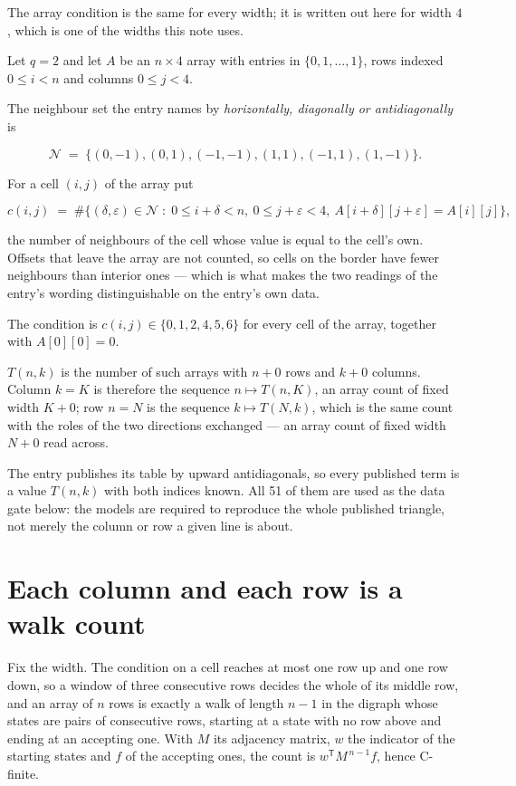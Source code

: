 \documentclass[11pt]{article}
\theoremstyle{definition}
\begin{document}
The array condition is the same for every width; it is written out here for width $4$, which is one of the widths this note uses.

Let $q = 2$ and let $A$ be an $n \times 4$ array with entries in $\{0,1,\dots,1\}$, rows indexed $0 \le i < n$ and columns $0 \le j < 4$.

The neighbour set the entry names by {\itshape horizontally, diagonally or antidiagonally} is

\[\mathcal{N} \;=\; \{(0,-1), (0,1), (-1,-1), (1,1), (-1,1), (1,-1)\}.\]

For a cell $(i,j)$ of the array put

\[c(i,j) \;=\; \#\bigl\{(\delta,\varepsilon)\in\mathcal{N} \;:\; 0\le i+\delta<n,\ 0\le j+\varepsilon<4,\ A[i+\delta][j+\varepsilon] = A[i][j]\bigr\},\]

the number of neighbours of the cell whose value is equal to the cell's own. Offsets that leave the array are not counted, so cells on the border have fewer neighbours than interior ones --- which is what makes the two readings of the entry's wording distinguishable on the entry's own data.

The condition is $c(i,j) \in \{0, 1, 2, 4, 5, 6\}$ for every cell of the array, together with $A[0][0]=0$.

$T(n,k)$ is the number of such arrays with $n + 0$ rows and $k + 0$ columns. Column $k = K$ is therefore the sequence $n \mapsto T(n,K)$, an array count of fixed width $K + 0$; row $n = N$ is the sequence $k \mapsto T(N,k)$, which is the same count with the roles of the two directions exchanged --- an array count of fixed width $N + 0$ read across.

The entry publishes its table by upward antidiagonals, so every published term is a value $T(n,k)$ with both indices known. All 51 of them are used as the data gate below: the models are required to reproduce the whole published triangle, not merely the column or row a given line is about.

\section{Each column and each row is a walk count}

Fix the width. The condition on a cell reaches at most one row up and one row down, so a window of three consecutive rows decides the whole of its middle row, and an array of $n$ rows is exactly a walk of length $n-1$ in the digraph whose states are pairs of consecutive rows, starting at a state with no row above and ending at an accepting one. With $M$ its adjacency matrix, $w$ the indicator of the starting states and $f$ of the accepting ones, the count is $w^{\mathsf T}M^{\,n-1}f$, hence C-finite.
\end{document}
